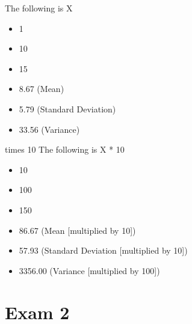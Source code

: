 \documentclass[11pt]{report}
\begin{document}
{
    \begin{multicols}{3}
        The following is X
        \begin{itemize}
            \item 1
            \item 10
            \item 15
        \end{itemize}
        \begin{itemize}
            \item 8.67 (Mean)
            \item 5.79 (Standard Deviation)
            \item 33.56 (Variance)
        \end{itemize}
        \columnbreak
        times 10
        \columnbreak
        The following is X * 10
        \begin{itemize}
            \item 10
            \item 100
            \item 150
        \end{itemize}
        \begin{itemize}
            \item 86.67 (Mean [multiplied by 10])
            \item 57.93 (Standard Deviation [multiplied by 10])
            \item 3356.00 (Variance [multiplied by 100])
        \end{itemize}
    \end{multicols}
}

\chapter{Exam 2}
\end{document}
